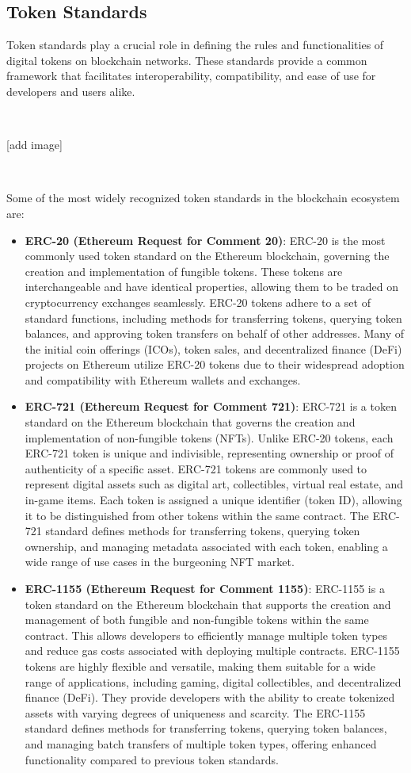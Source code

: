 \subsection{Token Standards}
Token standards play a crucial role in defining the rules and functionalities of digital tokens on blockchain networks. These standards provide a common framework that facilitates interoperability, compatibility, and ease of use for developers and users alike.

~

[add image]

~

Some of the most widely recognized token standards in the blockchain ecosystem are:
\begin{itemize}
    \item \textbf{ERC-20 (Ethereum Request for Comment 20)}: ERC-20 is the most commonly used token standard on the Ethereum blockchain, governing the creation and implementation of fungible tokens. These tokens are interchangeable and have identical properties, allowing them to be traded on cryptocurrency exchanges seamlessly. ERC-20 tokens adhere to a set of standard functions, including methods for transferring tokens, querying token balances, and approving token transfers on behalf of other addresses. Many of the initial coin offerings (ICOs), token sales, and decentralized finance (DeFi) projects on Ethereum utilize ERC-20 tokens due to their widespread adoption and compatibility with Ethereum wallets and exchanges.
    \item \textbf{ERC-721 (Ethereum Request for Comment 721)}: ERC-721 is a token standard on the Ethereum blockchain that governs the creation and implementation of non-fungible tokens (NFTs). Unlike ERC-20 tokens, each ERC-721 token is unique and indivisible, representing ownership or proof of authenticity of a specific asset. ERC-721 tokens are commonly used to represent digital assets such as digital art, collectibles, virtual real estate, and in-game items. Each token is assigned a unique identifier (token ID), allowing it to be distinguished from other tokens within the same contract. The ERC-721 standard defines methods for transferring tokens, querying token ownership, and managing metadata associated with each token, enabling a wide range of use cases in the burgeoning NFT market.
    \item \textbf{ERC-1155 (Ethereum Request for Comment 1155)}: ERC-1155 is a token standard on the Ethereum blockchain that supports the creation and management of both fungible and non-fungible tokens within the same contract. This allows developers to efficiently manage multiple token types and reduce gas costs associated with deploying multiple contracts. ERC-1155 tokens are highly flexible and versatile, making them suitable for a wide range of applications, including gaming, digital collectibles, and decentralized finance (DeFi). They provide developers with the ability to create tokenized assets with varying degrees of uniqueness and scarcity. The ERC-1155 standard defines methods for transferring tokens, querying token balances, and managing batch transfers of multiple token types, offering enhanced functionality compared to previous token standards.
\end{itemize}

